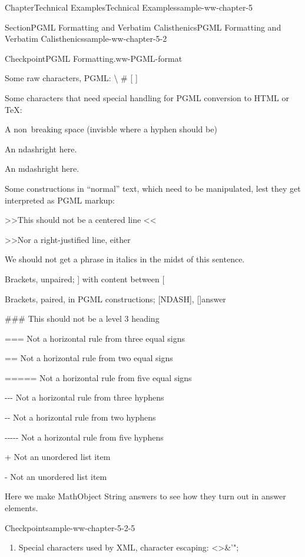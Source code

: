 \documentclass[oneside,10pt,]{book}
\numberwithin{equation}{section}
\begin{document}
\begin{chapterptx}{Chapter}{Technical Examples}{}{Technical Examples}{}{}{sample-ww-chapter-5}
\begin{sectionptx}{Section}{PGML Formatting and Verbatim Calisthenics}{}{PGML Formatting and Verbatim Calisthenics}{}{}{sample-ww-chapter-5-2}
\begin{inlineexercise}{Checkpoint}{PGML Formatting.}{ww-PGML-format}
\par
Some raw characters, PGML:        \textbackslash{} \textasteriskcentered{} \# \textbraceleft{} \textbraceright{} [ ]%
\par
Some characters that need special handling for PGML conversion to HTML or \TeX{}:%
\par
A non~breaking space (invisble where a hyphen should be)%
\par
An ndash\textendash{}right here.%
\par
An mdash\textemdash{}right here.%
\par
Some constructions in ``normal'' text, which need to be manipulated, lest they get interpreted as PGML markup:%
\par
\textgreater{}\textgreater{}This should not be a centered line \textless{}\textless{}%
\par
\textgreater{}\textgreater{}Nor a right-justified line, either%
\par
We should not get \textunderscore{}a phrase in italics\textunderscore{} in the midst of this sentence.%
\par
Brackets, unpaired; ] with content between [%
\par
Brackets, paired, in PGML constructions; [\textdollar{}NDASH]\textasteriskcentered{}, [\textunderscore{}\textunderscore{}\textunderscore{}]\textbraceleft{}\textdollar{}answer\textbraceright{}%
\par
\#\#\# This should not be a level 3 heading%
\par
===   Not a horizontal rule from three equal signs%
\par
==    Not a horizontal rule from two equal signs%
\par
===== Not a horizontal rule from five equal signs%
\par
-{}-{}-   Not a horizontal rule from three hyphens%
\par
-{}-{}    Not a horizontal rule from two hyphens%
\par
-{}-{}-{}-{}- Not a horizontal rule from five hyphens%
\par
+ Not an unordered list item%
\par
- Not an unordered list item%
\end{inlineexercise}%
Here we make MathObject String answers to see how they turn out in answer elements.%
\begin{inlineexercise}{Checkpoint}{}{sample-ww-chapter-5-2-5}%
%
\begin{enumerate}[label={\alph*.}]
\item{}Special characters used by XML, character escaping: \textless{}\textgreater{}\&'";%

\end{enumerate}
\end{inlineexercise}
\end{sectionptx}
\end{chapterptx}
\end{document}
